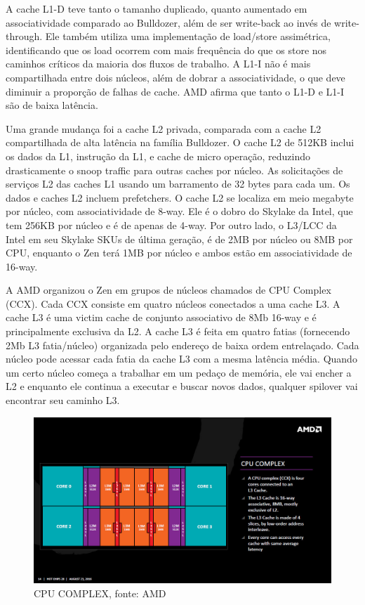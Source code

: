 \documentclass[12pt]{article}
\begin{document}
A cache L1-D teve tanto o tamanho duplicado, quanto aumentado em associatividade comparado ao Bulldozer, além de ser write-back ao invés de write-through. Ele também utiliza uma implementação de load/store assimétrica, identificando que os load ocorrem com mais frequência do que os store nos caminhos críticos da maioria dos fluxos de trabalho. A L1-I não é mais compartilhada entre dois núcleos, além de dobrar a associatividade, o que deve diminuir a proporção de falhas de cache. AMD afirma que tanto o L1-D e L1-I são de baixa latência.

Uma grande mudança foi a cache L2 privada, comparada com a cache L2 compartilhada de alta latência na família Bulldozer. O cache L2 de 512KB inclui os dados da L1, instrução da L1, e cache de micro operação, reduzindo drasticamente o snoop traffic para outras caches por núcleo. As solicitações de serviços L2 das caches L1 usando um barramento de 32 bytes para cada um. Os dados e caches L2 incluem prefetchers. O cache L2 se localiza em meio megabyte por núcleo, com associatividade de 8-way. Ele é o dobro do Skylake da Intel, que tem 256KB por núcleo e é de apenas de 4-way. Por outro lado, o L3/LCC da Intel em seu Skylake SKUs de última geração, é de 2MB por núcleo ou 8MB por CPU, enquanto o Zen terá 1MB por núcleo e ambos estão em associatividade de 16-way. 

A AMD organizou o Zen em grupos de núcleos chamados de CPU Complex (CCX). Cada CCX consiste em quatro núcleos conectados a uma cache L3. A cache L3 é uma victim cache de conjunto associativo de 8Mb 16-way e é principalmente exclusiva da L2. A cache L3 é feita em quatro fatias (fornecendo 2Mb L3 fatia/núcleo) organizada pelo endereço de baixa ordem entrelaçado. Cada núcleo pode acessar cada fatia da cache L3 com a mesma latência média. Quando um certo núcleo começa a trabalhar em um pedaço de memória, ele vai encher a L2 e enquanto ele continua a executar e buscar novos dados, qualquer spilover vai encontrar seu caminho L3.


\begin{figure}[H]
\centering
\includegraphics[width=115mm,scale=0.8]{Cache2.jpg}
\caption{CPU COMPLEX, fonte: AMD}
\label{fig:cache}
\end{figure}
\end{document}
